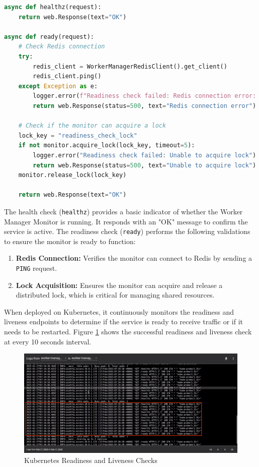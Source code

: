 \begin{lstlisting}[language=python, caption={Worker Manager Monitor Health and Readiness Checks}, label={lst:health_check}]
async def healthz(request):
    return web.Response(text="OK")

async def ready(request):
    # Check Redis connection
    try:
        redis_client = WorkerManagerRedisClient().get_client()
        redis_client.ping()
    except Exception as e:
        logger.error(f"Readiness check failed: Redis connection error: {str(e)}")
        return web.Response(status=500, text="Redis connection error")

    # Check if the monitor can acquire a lock
    lock_key = "readiness_check_lock"
    if not monitor.acquire_lock(lock_key, timeout=5):
        logger.error("Readiness check failed: Unable to acquire lock")
        return web.Response(status=500, text="Unable to acquire lock")
    monitor.release_lock(lock_key)

    return web.Response(text="OK")
\end{lstlisting}

The health check (\texttt{healthz}) provides a basic indicator of whether the Worker Manager Monitor is running. It responds with an "OK" message to confirm the service is active.
The readiness check (\texttt{ready}) performs the following validations to ensure the monitor is ready to function:
\begin{enumerate}
    \item \textbf{Redis Connection:} Verifies the monitor can connect to Redis by sending a \texttt{PING} request.
    \item \textbf{Lock Acquisition:} Ensures the monitor can acquire and release a distributed lock, which is critical for managing shared resources.
\end{enumerate}

When deployed on Kubernetes, it continuously monitors the readiness and liveness endpoints to determine if the service is ready to receive traffic or if it needs to be restarted. Figure \ref{fig:k8s_healthcheck} shows the successful readiness and liveness check at every 10 seconds interval.

\begin{figure}[H]
  \centering
  \includegraphics[width=\textwidth]{figures/k8s_healthcheck.png}
  \caption{Kubernetes Readiness and Liveness Checks}
  \label{fig:k8s_healthcheck}
\end{figure}


